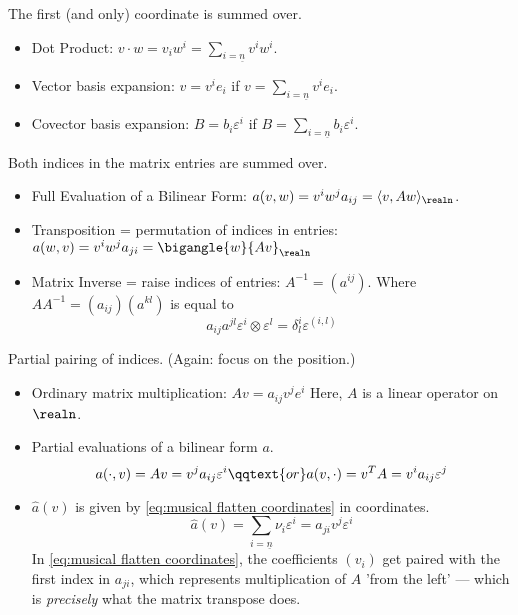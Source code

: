 \documentclass[../main-v2-manifolds.tex]{subfiles}
\begin{document}
The first (and only) coordinate is summed over. 
\begin{itemize}
    \item Dot Product: $v\cdot w = v_iw^i = \sum_{i=\underline{n}}v^iw^i$.
    \item Vector basis expansion: $v = v^ie_i$ if $v = \sum_{i=\underline{n}} v^ie_i$.
    \item Covector basis expansion: $B = b_i\varepsilon^i$ if $B = \sum_{i=\underline{n}} b_i\varepsilon^i$.
\end{itemize}
Both indices in the matrix entries are summed over.
\begin{itemize}
    \item Full Evaluation of a Bilinear Form: $a(v,w)= v^iw^ja_{ij}=\langle v,Aw\rangle_\realn $.
    \item Transposition = permutation of indices in entries: $a(w,v) = v^iw^ja_{ji} = \bigangle{w}{Av}_{\realn}$
    \item Matrix Inverse = raise indices of entries: $A^{-1} = (a^{ij})$. Where $AA^{-1} = (a_{ij})(a^{kl})$ is equal to 
    \[
     a_{ij}a^{jl}\varepsilon^i\otimes\varepsilon^l= \delta^{i}_{l}\varepsilon^{(i,l)}
    \]
\end{itemize}
Partial pairing of indices. (Again: focus on the position.)
\begin{itemize}
    \item Ordinary matrix multiplication: $Av = a_{ij}v^je^i$ Here, $A$ is a linear operator on $\realn$. 
    \item Partial evaluations of a bilinear form $a$.
    \[
       a(\cdot, v) = Av = v^ja_{ij}\varepsilon^i\qqtext{or}a(v,\cdot) = v^TA = v^ia_{ij}\varepsilon^j
    \]
    \item $\hat{a}(v)$ is given by \cref{eq:musical flatten coordinates} in coordinates.
    \begin{equation}
        \hat{a}(v) = \sum_{i=\underline{n}}\nu_i\varepsilon^i = a_{ji}v^j\varepsilon^i
        \label{eq:musical flatten coordinates}
    \end{equation}
    In \cref{eq:musical flatten coordinates}, the coefficients $(v_i)$ get paired with the first index in $a_{ji}$, which represents multiplication of $A$ 'from the left' --- which is \emph{precisely} what the matrix transpose does.
\end{itemize}
\end{document}
